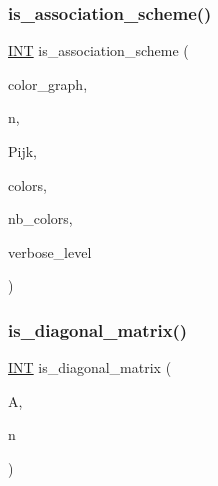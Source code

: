 \subsubsection{\texorpdfstring{is\+\_\+association\+\_\+scheme()}{is\_association\_scheme()}}
{\footnotesize\ttfamily \mbox{\hyperlink{galois_8h_a09fddde158a3a20bd2dcadb609de11dc}{I\+NT}} is\+\_\+association\+\_\+scheme (\begin{DoxyParamCaption}\item[{\mbox{\hyperlink{galois_8h_a09fddde158a3a20bd2dcadb609de11dc}{I\+NT}} $\ast$}]{color\+\_\+graph,  }\item[{\mbox{\hyperlink{galois_8h_a09fddde158a3a20bd2dcadb609de11dc}{I\+NT}}}]{n,  }\item[{\mbox{\hyperlink{galois_8h_a09fddde158a3a20bd2dcadb609de11dc}{I\+NT}} $\ast$\&}]{Pijk,  }\item[{\mbox{\hyperlink{galois_8h_a09fddde158a3a20bd2dcadb609de11dc}{I\+NT}} $\ast$\&}]{colors,  }\item[{\mbox{\hyperlink{galois_8h_a09fddde158a3a20bd2dcadb609de11dc}{I\+NT}} \&}]{nb\+\_\+colors,  }\item[{\mbox{\hyperlink{galois_8h_a09fddde158a3a20bd2dcadb609de11dc}{I\+NT}}}]{verbose\+\_\+level }\end{DoxyParamCaption})}

\mbox{\label{galois__global_8_c_a702b940ed7e1940ba0643bae4e0cce89}} 
\subsubsection{\texorpdfstring{is\+\_\+diagonal\+\_\+matrix()}{is\_diagonal\_matrix()}}
{\footnotesize\ttfamily \mbox{\hyperlink{galois_8h_a09fddde158a3a20bd2dcadb609de11dc}{I\+NT}} is\+\_\+diagonal\+\_\+matrix (\begin{DoxyParamCaption}\item[{\mbox{\hyperlink{galois_8h_a09fddde158a3a20bd2dcadb609de11dc}{I\+NT}} $\ast$}]{A,  }\item[{\mbox{\hyperlink{galois_8h_a09fddde158a3a20bd2dcadb609de11dc}{I\+NT}}}]{n }\end{DoxyParamCaption})}

\mbox{\label{galois__global_8_c_a5b8bbed726ce8d069a63bdd60665315e}} 
